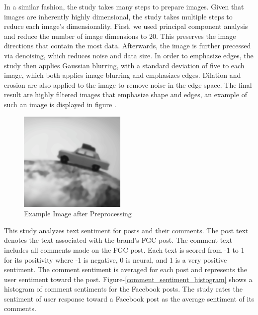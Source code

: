 \documentclass[mksc,blindrev]{informs3} %
\begin{document}
In a similar fashion, the study takes many steps to prepare images. Given that images are inherently highly dimensional, the study takes multiple steps to reduce each image's dimensionality. First, we used principal component analysis and reduce the number of image dimensions to 20. This preserves the image directions that contain the most data. Afterwards, the image is further precessed via denoising, which reduces noise and data size. In order to emphasize edges, the study then applies Gaussian blurring, with a standard deviation of five to each image, which both applies image blurring and emphasizes edges. Dilation and erosion are also applied to the image to remove noise in the edge space. The final result are highly filtered images that emphasize shape and edges, an example of such an image is displayed in figure \cite{processed_image}. 

\begin{figure}
\centering
\includegraphics[width=\columnwidth]{images/preprocessed_image.png}
\caption{Example Image after Preprocessing}
\label{processed_image}
\end{figure}

This study analyzes text sentiment for posts and their comments. The post text denotes the text associated with the brand's FGC post. The comment text includes all comments made on the FGC post. Each text is scored from -1 to 1 for its positivity where -1 is negative, 0 is neural, and 1 is a very positive sentiment. The comment sentiment is averaged for each post and represents the user sentiment toward the post. Figure-\ref{comment_sentiment_histogram} shows a histogram of comment sentiments for the Facebook posts. The study rates the sentiment of user response toward a Facebook post as the average sentiment of its comments.
\end{document}

